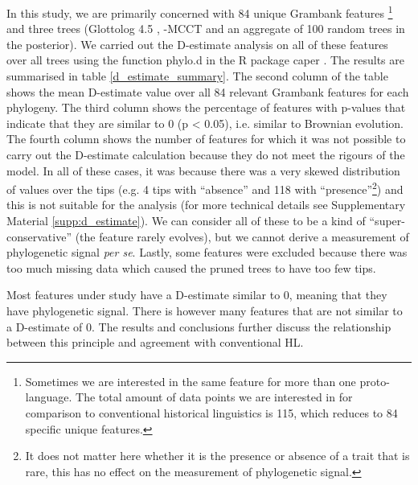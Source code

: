 \documentclass[12pt,letterpaper]{article}
\begin{document}
In this study, we are primarily concerned with 84 unique Grambank features \footnote{Sometimes we are interested in the same feature for more than one proto-language. The total amount of data points we are interested in for comparison to conventional historical linguistics is 115, which reduces to 84 specific unique features.} and three trees (Glottolog 4.5 \citep{glottolog4_5}, \citet{grayetal_2009}-MCCT and an aggregate of 100 random trees in the \citet{grayetal_2009} posterior). We carried out the D-estimate analysis on all of these features over all trees using the function phylo.d in the R package caper \citep{orme2013caper}. The results are summarised in table \ref{d_estimate_summary}. The second column of the table shows the mean D-estimate value over all 84 relevant Grambank features for each phylogeny. The third column shows the percentage of features with p-values that indicate that they are similar to 0 (p < 0.05), i.e. similar to Brownian evolution. The fourth column shows the number of features for which it was not possible to carry out the D-estimate calculation because they do not meet the rigours of the model. In all of these cases, it was because there was a very skewed distribution of values over the tips (e.g. 4 tips with ``absence'' and 118 with ``presence''\footnote{It does not matter here whether it is the presence or absence of a trait that is rare, this has no effect on the measurement of phylogenetic signal.}) and this is not suitable for the analysis (for more technical details see Supplementary Material \ref{supp:d_estimate}). We can consider all of these to be a kind of ``super-conservative'' (the feature rarely evolves), but we cannot derive a measurement of phylogenetic signal \emph{per se}. Lastly, some features were excluded because there was too much missing data which caused the pruned trees to have too few tips.



Most features under study have a D-estimate similar to 0, meaning that they have phylogenetic signal. There is however many features that are not similar to a D-estimate of 0. The results and conclusions further discuss the relationship between this principle and agreement with conventional HL.
\end{document}
